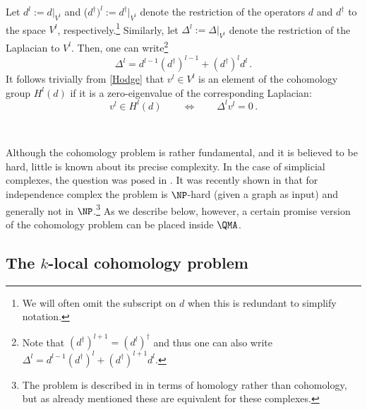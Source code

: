 \documentclass[11pt]{article}
\numberwithin{equation}{section}
\newcommand\equ[1] {\begin{equation}#1\end{equation}}
\renewcommand\( {\left(}
\renewcommand\) {\right)}
\begin{document}
Let $d^l:=d|_{V^l}$ and ($d^\dagger)^l:=d^\dagger|_{V^l}$ denote the restriction of the operators $d$ and $d^\dagger$ to the space $V^l$, respectively.\footnote{We will often omit the subscript on $d$ when this is redundant to simplify notation. } Similarly, let $\Delta^l:= \Delta|_{V^l}$ denote the restriction of the Laplacian to $V^l$. Then, one can write\footnote{ Note that $(d^\dagger)^{l+1}=(d^{l})^\dagger$ and thus one can also write $\Delta^l=d^{l-1} (d^\dagger)^l+(d^\dagger)^{l+1} d^l$.} 
\equ{
\Delta^l = d^{l-1} (d^\dagger)^{l-1}+(d^\dagger)^{l} d^l \,.
}
It follows trivially from  \eqref{Hodge} that  $v^l\in V^l$ is an element of the cohomology group $H^l(d)$  if it is a zero-eigenvalue of the corresponding Laplacian: 
\equ{\label{Hodgel}
v^l\in H^l(d) \qquad \Leftrightarrow \qquad \Delta^l v^l=0\,.
}


\  

Although the cohomology problem is rather fundamental, and it is believed to be hard, little is known about its precise complexity. In the case of simplicial complexes, the question was posed  in \cite{2002math......2204K}. It was recently shown in \cite{ADAMASZEK20168} that for  independence complex the problem is $\NP$-hard (given a graph as input) and generally not in $\NP$.\footnote{The problem is described in \cite{ADAMASZEK20168} in terms of homology rather than cohomology, but as already mentioned these are equivalent for these complexes. } As we describe below, however, a certain promise version of the cohomology problem can be placed inside $\QMA$. 

\subsection{The $k$-local cohomology problem}
\end{document}
